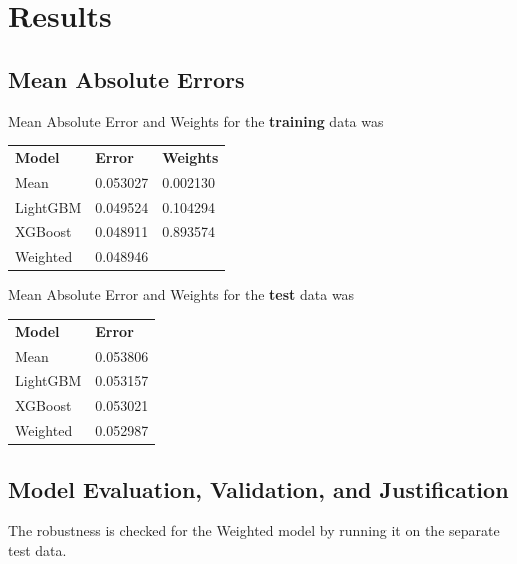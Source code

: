 \documentclass[a4paper]{article}
\begin{document}
\section{Results}

\subsection{Mean Absolute Errors}
Mean Absolute Error and Weights for the \textbf{training} data was
\begin{center}
\begin{tabular}{ l l l }
    \textbf{Model} & \textbf{Error} & \textbf{Weights} \\
    Mean & 0.053027 & 0.002130 \\
    LightGBM & 0.049524 & 0.104294 \\
    XGBoost  & 0.048911 & 0.893574 \\
    Weighted & 0.048946 & \\
\end{tabular}
\end{center}

Mean Absolute Error and Weights for the \textbf{test} data was
\begin{center}
\begin{tabular}{ l l }
    \textbf{Model} & \textbf{Error} \\
    Mean & 0.053806  \\
    LightGBM & 0.053157  \\
    XGBoost  & 0.053021  \\
    Weighted & 0.052987  \\
\end{tabular}
\end{center}


\subsection{Model Evaluation, Validation, and Justification}


The robustness is checked for the Weighted model by running it on the separate test data. 
\end{document}
